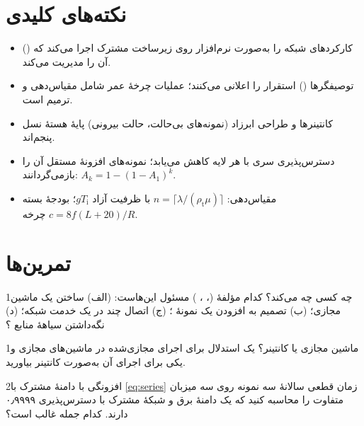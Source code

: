 \documentclass[11pt,a4paper]{article}
\begin{document}
\section{نکته‌های کلیدی}
\begin{takeawaybox}
\begin{itemize}
  \item {} کارکردهای شبکه را به‌صورت نرم‌افزار روی زیرساخت مشترک اجرا می‌کند که  () آن
        را مدیریت می‌کند.
  \item توصیفگرها () استقرار را اعلانی می‌کنند؛ عملیات چرخهٔ عمر شامل مقیاس‌دهی و ترمیم است.
  \item کانتینرها و طراحی ابرزاد (نمونه‌های بی‌حالت، حالت بیرونی) پایهٔ هستهٔ نسل پنجم‌اند.
  \item دسترس‌پذیری سری با هر لایه کاهش می‌یابد؛ نمونه‌های افزونهٔ مستقل آن را بازمی‌گردانند: $A_k = 1-(1-A_1)^k$.
  \item مقیاس‌دهی: $n = \lceil\lambda/(\rho_{\mathrm{t}}\mu)\rceil$ با ظرفیت آزاد $gT_\mathrm{i}$؛ بودجهٔ بسته $c = 8f(L+20)/R$ چرخه.
\end{itemize}
\end{takeawaybox}

\section{تمرین‌ها}

\begin{exercisebox}{1}{چه کسی چه می‌کند؟}\label{exr:mano}
کدام مؤلفهٔ  (، ، ) مسئول این‌هاست: (الف) ساختن یک ماشین مجازی؛ (ب) تصمیم به افزودن یک
نمونهٔ ؛ (ج) اتصال چند  در یک خدمت شبکه؛ (د) نگه‌داشتن سیاههٔ منابع ؟
\end{exercisebox}

\begin{exercisebox}{1}{ماشین مجازی یا کانتینر؟}\label{exr:vmct}
یک استدلال برای اجرای  مجازی‌شده در ماشین‌های مجازی و یکی برای اجرای آن به‌صورت کانتینر بیاورید.
\end{exercisebox}

\begin{exercisebox}{2}{افزونگی با دامنهٔ مشترک}\label{exr:host}
با \cref{eq:series} زمان قطعی سالانهٔ سه نمونه روی سه میزبان متفاوت را محاسبه کنید که یک دامنهٔ برق و شبکهٔ مشترک با
دسترس‌پذیری ۰٫۹۹۹۹ دارند. کدام جمله غالب است؟
\end{exercisebox}
\end{document}
